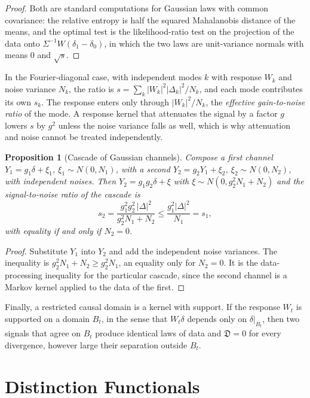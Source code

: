 \documentclass[11pt,oneside]{book}
\newtheorem{proposition}[theorem]{Proposition}
\theoremstyle{definition}
\theoremstyle{remark}
\begin{document}
\begin{proof}
Both are standard computations for Gaussian laws with common covariance: the relative entropy is half the squared Mahalanobis distance of the means, and the optimal test is the likelihood-ratio test on the projection of the data onto $\Sigma^{-1}W(\delta_1-\delta_0)$, in which the two laws are unit-variance normals with means $0$ and $\sqrt s$.
\end{proof}

In the Fourier-diagonal case, with independent modes $k$ with response $W_k$ and noise variance $N_k$, the ratio is $s=\sum_k|W_k|^2|\Delta_k|^2/N_k$, and each mode contributes its own $s_k$. The response enters only through $|W_k|^2/N_k$, the \emph{effective gain-to-noise ratio} of the mode. A response kernel that attenuates the signal by a factor $g$ lowers $s$ by $g^2$ unless the noise variance falls as well, which is why attenuation and noise cannot be treated independently.

\begin{proposition}[Cascade of Gaussian channels]\label{prop:cascade}
Compose a first channel $Y_1=g_1\delta+\xi_1$, $\xi_1\sim N(0,N_1)$, with a second $Y_2=g_2Y_1+\xi_2$, $\xi_2\sim N(0,N_2)$, with independent noises. Then $Y_2=g_1g_2\delta+\xi$ with $\xi\sim N(0,g_2^2N_1+N_2)$ and the signal-to-noise ratio of the cascade is
\[
s_2=\frac{g_1^2g_2^2\,|\Delta|^2}{g_2^2N_1+N_2}\leq\frac{g_1^2|\Delta|^2}{N_1}=s_1 ,
\]
with equality if and only if $N_2=0$.
\end{proposition}

\begin{proof}
Substitute $Y_1$ into $Y_2$ and add the independent noise variances. The inequality is $g_2^2N_1+N_2\geq g_2^2N_1$, an equality only for $N_2=0$. It is the data-processing inequality for the particular cascade, since the second channel is a Markov kernel applied to the data of the first.
\end{proof}

Finally, a restricted causal domain is a kernel with support. If the response $W_t$ is supported on a domain $B_t$, in the sense that $W_t\delta$ depends only on $\delta|_{B_t}$, then two signals that agree on $B_t$ produce identical laws of data and $\mathfrak D=0$ for every divergence, however large their separation outside $B_t$.

\chapter{Distinction Functionals}\label{ch:distinction}
\end{document}
